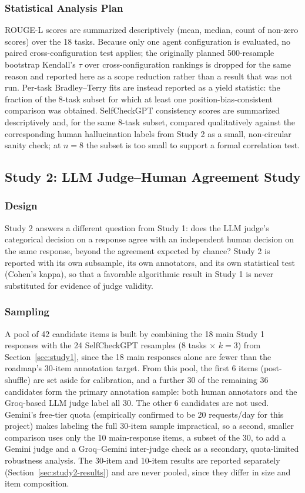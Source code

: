 \documentclass[conference]{IEEEtran}
\begin{document}
\subsubsection{Statistical Analysis Plan}
ROUGE-L scores are summarized descriptively (mean, median, count of non-zero scores) over the 18 tasks. Because only one agent configuration is evaluated, no paired cross-configuration test applies; the originally planned 500-resample bootstrap Kendall's $\tau$ over cross-configuration rankings is dropped for the same reason and reported here as a scope reduction rather than a result that was not run. Per-task Bradley--Terry fits are instead reported as a yield statistic: the fraction of the 8-task subset for which at least one position-bias-consistent comparison was obtained. SelfCheckGPT consistency scores are summarized descriptively and, for the same 8-task subset, compared qualitatively against the corresponding human hallucination labels from Study 2 as a small, non-circular sanity check; at $n=8$ the subset is too small to support a formal correlation test.

\subsection{Study 2: LLM Judge--Human Agreement Study}
\label{sec:study2}
\subsubsection{Design}
Study 2 answers a different question from Study 1: does the LLM judge's categorical decision on a response agree with an independent human decision on the same response, beyond the agreement expected by chance? Study 2 is reported with its own subsample, its own annotators, and its own statistical test (Cohen's kappa), so that a favorable algorithmic result in Study 1 is never substituted for evidence of judge validity.

\subsubsection{Sampling}
A pool of 42 candidate items is built by combining the 18 main Study 1 responses with the 24 SelfCheckGPT resamples ($8$ tasks $\times$ $k=3$) from Section~\ref{sec:study1}, since the 18 main responses alone are fewer than the roadmap's 30-item annotation target. From this pool, the first 6 items (post-shuffle) are set aside for calibration, and a further 30 of the remaining 36 candidates form the primary annotation sample: both human annotators and the Groq-based LLM judge label all 30. The other 6 candidates are not used. Gemini's free-tier quota (empirically confirmed to be 20 requests/day for this project) makes labeling the full 30-item sample impractical, so a second, smaller comparison uses only the 10 main-response items, a subset of the 30, to add a Gemini judge and a Groq--Gemini inter-judge check as a secondary, quota-limited robustness analysis. The 30-item and 10-item results are reported separately (Section~\ref{sec:study2-results}) and are never pooled, since they differ in size and item composition.
\end{document}
